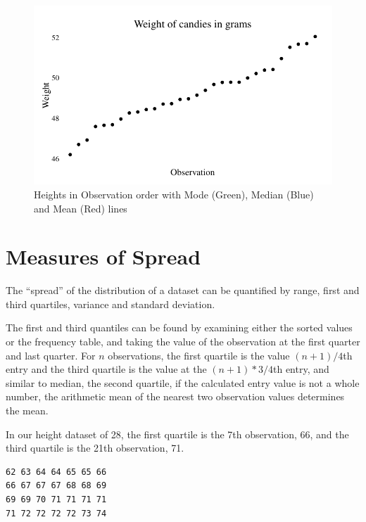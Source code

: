 \documentclass[nohyper,justified]{tufte-handout}\usepackage[]{graphicx}\usepackage[]{color}
\makeatletter
\def\maxwidth{ %
  \ifdim\Gin@nat@width>\linewidth
    \linewidth
  \else
    \Gin@nat@width
  \fi
}
\newenvironment{kframe}{%
 \def\at@end@of@kframe{}%
 \ifinner\ifhmode%
  \def\at@end@of@kframe{\end{minipage}}%
  \begin{minipage}{\columnwidth}%
 \fi\fi%
 \def\FrameCommand##1{\hskip\@totalleftmargin \hskip-\fboxsep
 \colorbox{shadecolor}{##1}\hskip-\fboxsep
     \hskip-\linewidth \hskip-\@totalleftmargin \hskip\columnwidth}%
 \MakeFramed {\advance\hsize-\width
   \@totalleftmargin\z@ \linewidth\hsize
   \@setminipage}}%
 {\par\unskip\endMakeFramed%
 \at@end@of@kframe}
\newenvironment{knitrout}{}{} %
\makeatother
\begin{document}
\begin{knitrout}
\color{fgcolor}\begin{figure}

{\centering \includegraphics[width=\maxwidth]{figure/graphics-center-chart-1} 

}

\caption[Heights in Observation order with Mode (Green), Median (Blue) and Mean (Red) lines]{Heights in Observation order with Mode (Green), Median (Blue) and Mean (Red) lines}\label{fig:center-chart}
\end{figure}


\end{knitrout}



\section{Measures of Spread}

The ``spread'' of the distribution of a dataset can be quantified by range, first and third quartiles, variance and standard deviation.

The first and third quantiles can be found by examining either the sorted values or the frequency table, and taking the value of the observation at the first quarter and last quarter. For $n$ observations, the first quartile is the value $(n+1)/4$th entry and the third quartile is the value at the $(n+1)*3/4$th entry, and similar to median, the second quartile, if the calculated entry value is not a whole number, the arithmetic mean of the nearest two observation values determines the mean.



In our height dataset of 28, the first quartile is the 7th observation, 66, and the third quartile is the 21th observation, 71.
\begin{knitrout}
\color{fgcolor}\begin{kframe}
\begin{verbatim}
62 63 64 64 65 65 66
66 67 67 67 68 68 69
69 69 70 71 71 71 71
71 72 72 72 72 73 74
\end{verbatim}
\end{kframe}
\end{knitrout}
\end{document}
